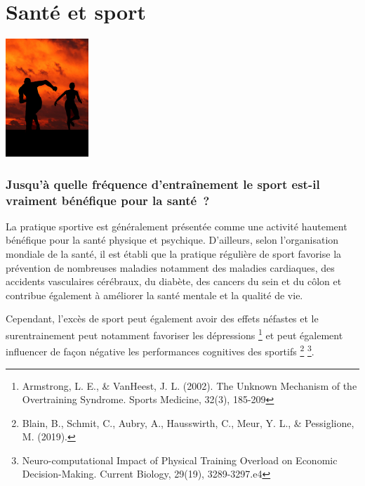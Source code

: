 \documentclass[
  10pt,
  french,
  a5paper,
  openany]{book}
\begin{document}
\hypertarget{santuxe9-et-sport}{%
\chapter{Santé et sport}\label{santuxe9-et-sport}}

\begin{center}
\includegraphics[width=\textwidth,height=12em]{images/sante-sport.jpg}

\end{center}

\hypertarget{jusquuxe0-quelle-fruxe9quence-dentrauxeenement-le-sport-est-il-vraiment-buxe9nuxe9fique-pour-la-santuxe9}{%
\subsection*{Jusqu'à quelle fréquence d'entraînement le sport est-il vraiment bénéfique pour la santé~?}\label{jusquuxe0-quelle-fruxe9quence-dentrauxeenement-le-sport-est-il-vraiment-buxe9nuxe9fique-pour-la-santuxe9}}

La pratique sportive est généralement présentée comme une activité hautement bénéfique pour la santé physique et psychique. D'ailleurs, selon l'organisation mondiale de la santé, il est établi que la pratique régulière de sport favorise la prévention de nombreuses maladies notamment des maladies cardiaques, des accidents vasculaires cérébraux, du diabète, des cancers du sein et du côlon et contribue également à améliorer la santé mentale et la qualité de vie.

Cependant, l'excès de sport peut également avoir des effets néfastes et le surentrainement peut notamment favoriser les dépressions \footnote{Armstrong, L. E., \& VanHeest, J. L. (2002). The Unknown Mechanism of the Overtraining Syndrome. Sports Medicine, 32(3), 185-209} et peut également influencer de façon négative les performances cognitives des sportifs \footnote{Blain, B., Schmit, C., Aubry, A., Hausswirth, C., Meur, Y. L., \& Pessiglione, M. (2019).} \footnote{Neuro-computational Impact of Physical Training Overload on Economic Decision-Making. Current Biology, 29(19), 3289-3297.e4}.
\end{document}
